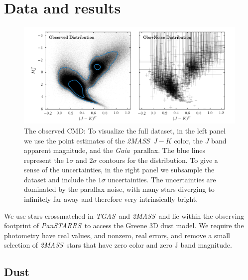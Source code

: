 \documentclass[modern]{aastex61}
\newcommand{\acronym}[1]{{\small{#1}}}
\newcommand{\project}[1]{\textsl{#1}}
\newcommand{\tgas}{\project{\acronym{TGAS}}}
\newcommand{\tmass}{\project{\acronym{2MASS}}}
\newcommand{\gaia}{\project{Gaia}}
\newcommand{\panstarrs}{\project{Pan\acronym{STARRS}}}
\newcommand{\cmd}{\acronym{CMD}}
\begin{document}
\section{Data and results}
\begin{figure}
\centering
  \includegraphics[width=\textwidth]{data.png}
\caption{The observed \cmd: To visualize the full dataset, in the left panel we use the point estimates of the \tmass\ $J-K$ color, the $J$ band apparent magnitude, and the \gaia\ parallax. The blue lines represent the $1\sigma$ and $2\sigma$ contours for the distribution. To give a sense of the uncertainties, in the right panel we subsample the dataset and include the $1\sigma$ uncertainties. The uncertainties are dominated by the parallax noise, with many stars diverging to infinitely far away and therefore very intrinsically bright.}
\label{fig:data}
\end{figure}

We use stars crossmatched in \tgas\ and \tmass\, and lie within the observing footprint of \panstarrs\ to access the Greene 3D dust model. We require the photometry have real values, and nonzero, real errors, and remove a small selection of \tmass\ stars that have zero color and zero J band magnitude.

\subsection{Dust}
\end{document}
